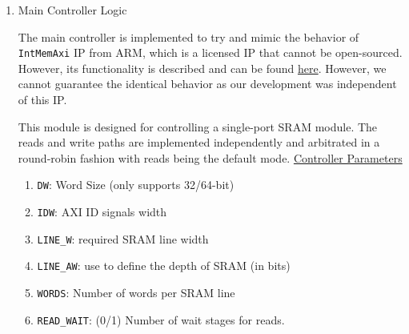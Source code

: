 \begin{enumerate}
    AXI4 limits the length of WRAP transactions to 2/4/8/16. This provides a neat little trick used to calculate the next address in a Wrap transaction without using the modulo operator\footnote{Credits for this trick: \href{https://zipcpu.com/blog/2019/04/27/axi-addr.html}{https://zipcpu.com/blog/2019/04/27/axi-addr.html}.}\footnote{My instinct is that they limit the length for Wrap Bursts for this very reason. Or it may just be that 16 is sufficient for most applications.}. For these Lengths, the value of \texttt{AxLEN} is 0001, 0011, 0111, 1111, respectively. Notice that once the address has been adjusted for word alignment (i.e., those least significant zeros are shifted out), then only the bit positions where there is a 1 in value of \texttt{AxLEN} should be changed in the address (when \texttt{AxLEN}) is aligned with least significant end of the address. Rest of the address should carry over from the before. This trick is realized with the following equation:
    \begin{align}
        \texttt{next\_addr\_wrap} = (\texttt{wrap\_mask}\ \&\ \texttt{next\_addr\_incr}) \mid (\sim \texttt{wrap\_mask}\ \&\ \texttt{curr\_addr}).
    \end{align}
    In the above expression, most of the terms should be self-explanatory, except perhaps \texttt{wrap\_mask}. This term is simply the \texttt{AxLEN} signal shifted to account for the word alignment and padded for address size. Bitwise complement of wrap mask has 1 in bit positions that should not change and be carried over from current address. 

    \item Main Controller Logic 
    
    The main controller is implemented to try and mimic the behavior of \texttt{IntMemAxi} IP from ARM, which is a licensed IP that cannot be open-sourced. However, its functionality is described and can be found \href{https://support.arm.com/documentation/dto0009/a/about-the-internal-memory-interface?lang=en}{here}. However, we cannot guarantee the identical behavior as our development was independent of this IP. 

    This module is designed for controlling a single-port SRAM module. The reads and write paths are implemented independently and arbitrated in a round-robin fashion with reads being the default mode. 
    \underline{Controller Parameters}
    \begin{enumerate}
        \item \texttt{DW}: Word Size (only supports 32/64-bit)
        \item \texttt{IDW}: AXI ID signals width
        \item \texttt{LINE\_W}: required SRAM line width
        \item \texttt{LINE\_AW}: use to define the depth of SRAM (in bits)
        \item \texttt{WORDS}: Number of words per SRAM line 
        \item \texttt{READ\_WAIT}: (0/1) Number of wait stages for reads. 
    \end{enumerate}
    

\end{enumerate}

